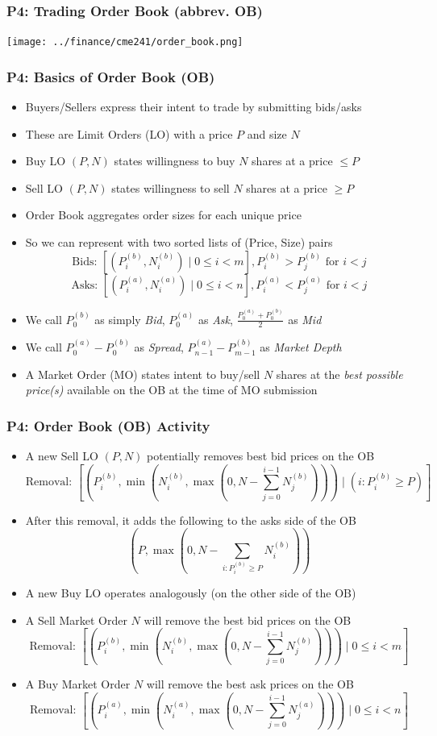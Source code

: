 \documentclass[handout]{beamer}
\begin{document}
\begin{frame}
\frametitle{P4: Trading Order Book (abbrev. OB)}
\texttt{[image: ../finance/cme241/order\_book.png]}
\end{frame}

\begin{frame}
\frametitle{P4: Basics of Order Book (OB)}
\pause
\begin{itemize}[<+->]
\item Buyers/Sellers express their intent to trade by submitting bids/asks
\item These are Limit Orders (LO) with a price $P$ and size $N$
\item Buy LO $(P, N)$ states willingness to buy $N$ shares at a price $\leq P$
\item Sell  LO $(P, N)$ states willingness to sell $N$ shares at a price $\geq P$
\item Order Book aggregates order sizes for each unique price
\item So we can represent with two sorted lists of (Price, Size) pairs
$$\mbox{Bids: } [(P_i^{(b)}, N_i^{(b)}) \mid 0 \leq i < m], P_i^{(b)} > P_j^{(b)} \mbox{ for } i < j$$
$$\mbox{Asks: } [(P_i^{(a)}, N_i^{(a)}) \mid 0 \leq i < n], P_i^{(a)} < P_j^{(a)} \mbox{ for } i < j$$
\item We call $P_0^{(b)}$ as simply {\em Bid}, $P_0^{(a)}$ as {\em Ask}, $\frac {P_0^{(a)} + P_0^{(b)}} 2$ as {\em Mid}
\item We call $P_0^{(a)} - P_0^{(b)}$ as {\em Spread}, $P_{n-1}^{(a)} - P_{m-1}^{(b)}$ as {\em Market Depth}
\item A Market Order (MO) states intent to buy/sell $N$ shares at the {\em best possible price(s)} available on the OB at the time of MO submission
\end{itemize}
\end{frame}

\begin{frame}
\frametitle{P4: Order Book (OB) Activity}
\pause
\begin{itemize}[<+->]
\item A new Sell LO $(P,N)$ potentially removes best bid prices on the OB
$$\mbox{Removal: } [(P_i^{(b)}, \min(N_i^{(b)}, \max(0, N - \sum_{j=0}^{i-1} N_j^{(b)}))) \mid (i: P_i^{(b)} \geq P)]$$
\item After this removal, it adds the following to the asks side of the OB 
$$(P, \max(0, N - \sum_{i: P_i^{(b)} \geq P}  N_i^{(b)}))$$
\item A new Buy LO operates analogously (on the other side of the OB)
\item A Sell Market Order $N$ will remove the best bid prices on the OB
$$\mbox{Removal: } [(P_i^{(b)}, \min(N_i^{(b)}, \max(0, N - \sum_{j=0}^{i-1} N_j^{(b)}))) \mid 0 \leq i < m]$$
\item A Buy Market Order $N$ will remove the best ask prices on the OB
$$\mbox{Removal: } [(P_i^{(a)}, \min(N_i^{(a)}, \max(0, N - \sum_{j=0}^{i-1} N_j^{(a)}))) \mid 0 \leq i < n]$$
\end{itemize}
\end{frame}
\end{document}
